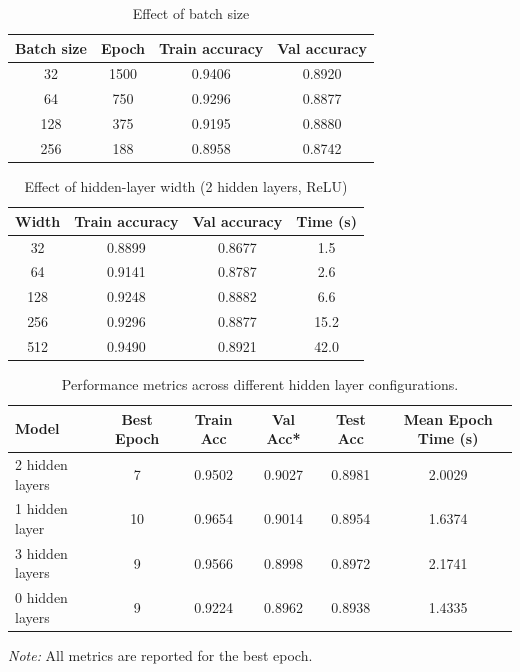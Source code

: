 \documentclass[11pt]{article}
\begin{document}
\begin{table}[htbp]
  \centering
  \caption{Effect of batch size}
  \label{tab:mlp-bs}
  \begin{tabular}{cccc}
    \toprule
    Batch size & Epoch & Train accuracy & Val accuracy \\
    \midrule
    32  & 1500 & 0.9406 & 0.8920 \\
    64  & 750  & 0.9296 & 0.8877 \\
    128 & 375  & 0.9195 & 0.8880 \\
    256 & 188  & 0.8958 & 0.8742 \\
    \bottomrule
  \end{tabular}
\end{table}

\begin{table}[htbp]
  \centering
  \caption{Effect of hidden-layer width (2 hidden layers, ReLU)}
  \label{tab:mlp-width}
  \begin{tabular}{cccc}
    \toprule
    Width & Train accuracy & Val accuracy & Time (s) \\
    \midrule
    32  & 0.8899 & 0.8677 & 1.5 \\
    64  & 0.9141 & 0.8787 & 2.6 \\
    128 & 0.9248 & 0.8882 & 6.6 \\
    256 & 0.9296 & 0.8877 & 15.2 \\
    512 & 0.9490 & 0.8921 & 42.0 \\
    \bottomrule
  \end{tabular}
\end{table}



\begin{table}[htbp]
\centering
\begin{tabular}{l c c c c c}
\hline
\textbf{Model} & \textbf{Best Epoch} & \textbf{Train Acc} & \textbf{Val Acc*} & \textbf{Test Acc} & \textbf{Mean Epoch Time (s)} \\
\hline
2 hidden layers & 7 & 0.9502 & 0.9027 & 0.8981 & 2.0029 \\
1 hidden layer  & 10 & 0.9654 & 0.9014 & 0.8954 & 1.6374 \\
3 hidden layers & 9 & 0.9566 & 0.8998 & 0.8972 & 2.1741 \\
0 hidden layers & 9 & 0.9224 & 0.8962 & 0.8938 & 1.4335 \\
\hline
\end{tabular}
\caption{Performance metrics across different hidden layer configurations.}
\label{tab:model_performance_1}
\footnotesize{\textit{Note:} All metrics are reported for the best epoch.}
\end{table}
\end{document}
